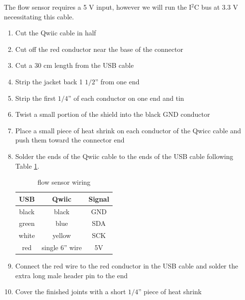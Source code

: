 \documentclass[11pt, letterpaper]{article}
\begin{document}
\begin{enumerate}
\begin{enumerate}[label=4.\arabic*]
The flow sensor requires a 5 V input, however we will run the I$^2$C bus at 3.3 V necessitating this cable. 
\\
\begin{enumerate}[label=4.1.\arabic*]
\item
Cut the Qwiic cable in half
\item
Cut off the red conductor near the base of the connector
\item
Cut a 30 cm length from the USB cable
\item
Strip the jacket back 1 $1/2$'' from one end
\item
Strip the first $1/4$'' of each conductor on one end and tin
\item
Twist a small portion of the shield into the black GND conductor
\item
Place a small piece of heat shrink on each conductor of the Qwicc cable and push them toward the connector end
\item
Solder the ends of the Qwiic cable to the ends of the USB cable following Table \ref{tab:flow}.
\begin{table}[H]
\centering
\begin{tabular}{| c | c | c |}
\hline
USB & Qwiic & Signal \\  \hline
black & black & GND \\  \hline
green & blue & SDA \\  \hline
white & yellow & SCK \\  \hline
red & single 6'' wire & 5V \\  
\hline
\end{tabular}
\caption{flow sensor wiring}
\label{tab:flow}
\end{table}
\item
Connect the red wire to the red conductor in the USB cable and solder the extra long male header pin to the end
\item
Cover the finished joints with a short $1/4$'' piece of heat shrink
\end{enumerate}


\end{enumerate}
\end{enumerate}
\end{document}
